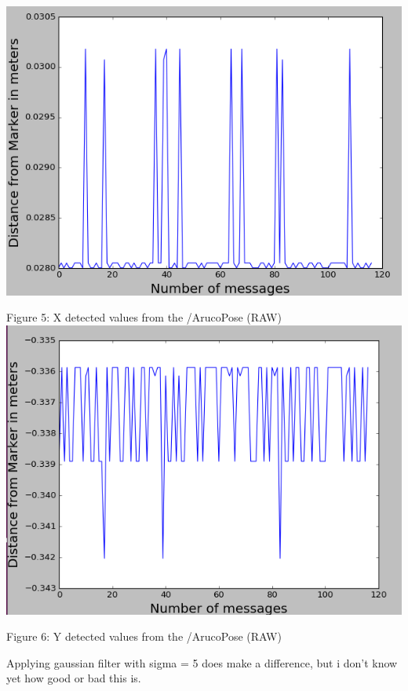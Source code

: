 \documentclass{article}
\begin{document}
\begin{center}
    \includegraphics[scale=0.5]{pic12.png}
    
    Figure 5: X detected values from the /ArucoPose (RAW)
    \includegraphics[scale=0.5]{pic13.png}
    
    Figure 6: Y detected values from the /ArucoPose (RAW)
\end{center}

Applying gaussian filter with sigma = 5 does make a difference, but i don't know yet how good or bad this is.
\end{document}
